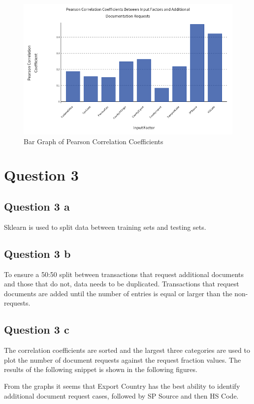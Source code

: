 \documentclass[a4paper,12pt]{article}
\numberwithin{equation}{section}
\numberwithin{figure}{section}
\numberwithin{table}{section}
\begin{document}
\begin{figure}[!htb]
    \centering
    \includegraphics[width=0.95\linewidth]{../../corrcoeff.png}
    \caption{Bar Graph of Pearson Correlation Coefficients}
    \label{fig:corrcoeff}
\end{figure}
\FloatBarrier

\section{Question 3}
\subsection{Question 3 a}
Sklearn is used to split data between training sets and testing sets.


\subsection{Question 3 b}
To ensure a 50:50 split between transactions that request additional documents and those that do not, data needs to be duplicated. Transactions that request documents are added until the number of entries is equal or larger than the non-requests. 


\subsection{Question 3 c}
The correlation coefficients are sorted and the largest three categories are used to plot the number of document requests against the request fraction values. The results of the following snippet is shown in the following figures. \par 
From the graphs it seems that Export Country has the best ability to identify additional document request cases, followed by SP Source and then HS Code.
\end{document}
